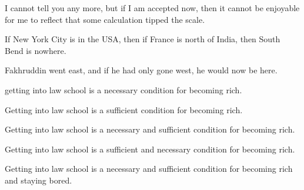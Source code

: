\begin{enumerate}
\begin{statement}{I cannot tell you any more, but if I am accepted now, then it cannot be enjoyable for me to reflect that some calculation tipped the scale.}
\end{statement}

\begin{statement}{If New York City is in the USA, then if France is north of India, then South Bend is nowhere.}
\end{statement}

\begin{statement}{Fakhruddin went east, and if he had only gone west, he would now be here.}
\end{statement}

\begin{statement}{getting into law school is a necessary condition for becoming rich.}
\end{statement}

\begin{statement}{Getting into law school is a sufficient condition for becoming rich.}
\end{statement}

\begin{statement}{Getting into law school is a necessary and sufficient condition for becoming rich.}
\end{statement}

\begin{statement}{Getting into law school is a sufficient and necessary condition for becoming rich.}
\end{statement}

\begin{statement}{Getting into law school is a necessary and sufficient condition for becoming rich and staying bored.}
\end{statement}


\end{enumerate}
